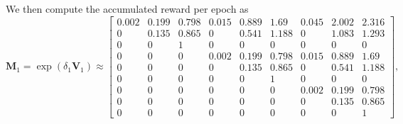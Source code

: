 \documentclass[hidelinks,11pt]{article}
\begin{document}
    We then compute the accumulated reward per epoch as
    \begin{equation*}
        \mathbf{M}_1 = \exp(\delta_1\mathbf{V}_1) \approx
        \left [
            \begin{array}{ccc|ccc|ccc}
                0.002 & 0.199 & 0.798 & 0.015 & 0.889 & 1.69  & 0.045 & 2.002 & 2.316 \\
                0     & 0.135 & 0.865 & 0     & 0.541 & 1.188 & 0     & 1.083 & 1.293 \\
                0     & 0     & 1     & 0     & 0     & 0     & 0     & 0     & 0     \\
                \hline
                0     & 0     & 0     & 0.002 & 0.199 & 0.798 & 0.015 & 0.889 & 1.69  \\
                0     & 0     & 0     & 0     & 0.135 & 0.865 & 0     & 0.541 & 1.188 \\
                0     & 0     & 0     & 0     & 0     & 1     & 0     & 0     & 0     \\
                \hline
                0     & 0     & 0     & 0     & 0     & 0     & 0.002 & 0.199 & 0.798 \\
                0     & 0     & 0     & 0     & 0     & 0     & 0     & 0.135 & 0.865 \\
                0     & 0     & 0     & 0     & 0     & 0     & 0     & 0     & 1
            \end{array}
            \right ],
    \end{equation*}
\end{document}
